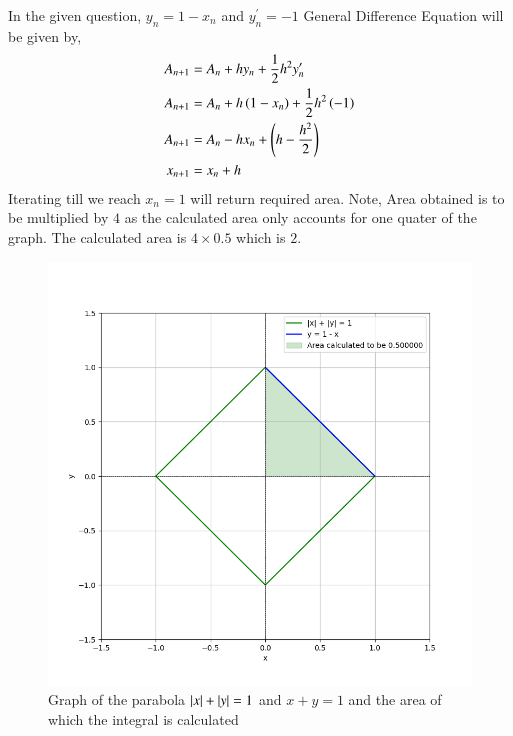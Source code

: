 \documentclass[journal]{IEEEtran}
\begin{document}
In the given question, $y_n=1 - x_n$ and $y^{\prime}_n=-1$\newline
General Difference Equation will be given by,
\begin{align}
  A_{n+1}&=A_n+hy_n+\frac{1}{2}h^2y^{\prime}_n\\
  A_{n+1}&=A_n+h\left(1-x_n\right)+\frac{1}{2}h^2\left(-1\right)\\
  A_{n+1}&=A_n -hx_n+\left(h-\frac{h^2}{2}\right)\\
  x_{n+1}&=x_n+h
\end{align}
Iterating till we reach $x_n=1$ will return required area. Note, Area obtained is to be multiplied by $4$ as the calculated area only accounts for one quater of the graph.\newline
The calculated area is $4\times 0.5$ which is $2$.
\begin{figure}[h!]
   \centering
   \includegraphics[width=1\columnwidth]{figs/fig.png}
   \caption{Graph of the parabola $\left\vert x\right\vert+\left\vert y\right\vert = 1$ and $x+y=1$ and the area of which the integral is calculated}
   \label{stemplot}
\end{figure}
\end{document}
